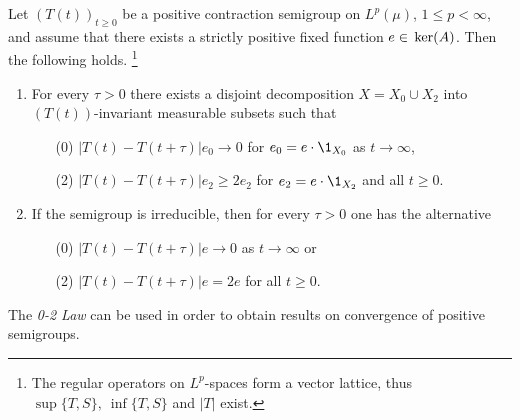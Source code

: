 \begin{theorem}\label{thm:c4-2.6}
%
%
%
Let $(T(t))_{t \geq 0}$ be a positive contraction semigroup on $L^{p}(\mu)$, $1 \leq p < \infty$, and assume that there exists a strictly positive fixed function $e \in \mathop{}\mathrm{ker}(A)$. 
Then the following holds. 
\footnote{The regular operators on $L^p$-spaces form a vector lattice, thus $\sup\{T,S\},\ \inf\{T,S\}$ and $|T|$ exist.}
\begin{enumerate}[\upshape (i)]
\item \label{thm:c4-2.6-1}
For every $\tau > 0$ there exists a disjoint decomposition $X = X_{0} \cup X_{2}$ into $(T(t))$-invariant measurable subsets such that
\begin{enumerate}
    \item[(0)] \label{thm:c4-2.6-1.1} 
    $|T(t) - T(t+\tau)|e_{0} \to 0$ for $e_{0} = e \cdot \1_{X_{0}}$ as $t \to \infty$,
    \item[(2)] \label{thm:c4-2.6-1.2} 
    $|T(t) - T(t+\tau)|e_{2} \geq 2e_{2}$ for $e_{2} = e \cdot \1_{X_{2}}$ and all $t \geq 0$.
    \end{enumerate}

\item \label{thm:c4-2.6-2} 
If the semigroup is irreducible, then for every $\tau > 0$ one has the alternative
\begin{enumerate}
    \item[(0)] \label{thm:c4-2.6-2.1} 
    $|T(t) - T(t+\tau)|e \to 0$ as $t \to \infty$ or
    \item[(2)] \label{thm:c4-2.6-2.2} 
    $|T(t) - T(t+\tau)|e = 2e$ for all $t \geq 0$.
\end{enumerate}
\end{enumerate}
\end{theorem}
The \emph{0-2 Law} can be used in order to obtain results on convergence of positive semigroups.

